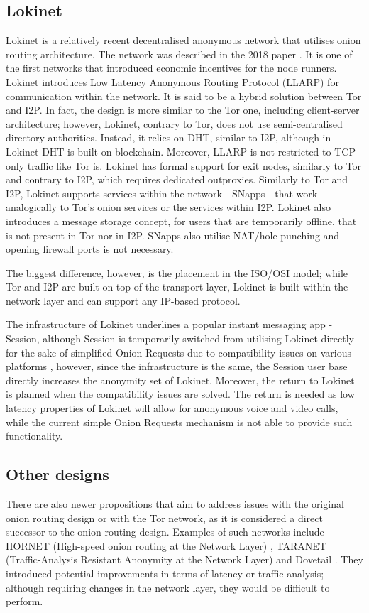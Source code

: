 \subsection{Lokinet}
Lokinet is a relatively recent decentralised anonymous network that utilises onion routing architecture. The network was described in the 2018 paper \cite{loki}. It is one of the first networks that introduced economic incentives for the node runners. Lokinet introduces Low Latency Anonymous Routing Protocol (LLARP) for communication within the network. It is said to be a hybrid solution between Tor and I2P. In fact, the design is more similar to the Tor one, including client-server architecture; however, Lokinet, contrary to Tor, does not use semi-centralised directory authorities. Instead, it relies on DHT, similar to I2P, although in Lokinet DHT is built on blockchain. Moreover, LLARP is not restricted to TCP-only traffic like Tor is. Lokinet has formal support for exit nodes, similarly to Tor and contrary to I2P, which requires dedicated outproxies. Similarly to Tor and I2P, Lokinet supports services within the network - SNapps - that work analogically to Tor’s onion services or the services within I2P. Lokinet also introduces a message storage concept, for users that are temporarily offline, that is not present in Tor nor in I2P. SNapps also utilise NAT/hole punching and opening firewall ports is not necessary.

The biggest difference, however, is the placement in the ISO/OSI model; while Tor and I2P are built on top of the transport layer, Lokinet is built within the network layer and can support any IP-based protocol.

The infrastructure of Lokinet underlines a popular instant messaging app - Session, although Session is temporarily switched from utilising Lokinet directly for the sake of simplified Onion Requests due to compatibility issues on various platforms \cite{onion-requests}, however, since the infrastructure is the same, the Session user base directly increases the anonymity set of Lokinet. Moreover, the return to Lokinet is planned when the compatibility issues are solved. The return is needed as low latency properties of Lokinet will allow for anonymous voice and video calls, while the current simple Onion Requests mechanism is not able to provide such functionality.

\subsection{Other designs}
There are also newer propositions that aim to address issues with the original onion routing design or with the Tor network, as it is considered a direct successor to the onion routing design. Examples of such networks include HORNET (High-speed onion routing at the Network Layer) \cite{hornet}, TARANET (Traffic-Analysis Resistant Anonymity at the Network Layer) \cite{taranet} and Dovetail \cite{dovetail}. They introduced potential improvements in terms of latency or traffic analysis; although requiring changes in the network layer, they would be difficult to perform.

